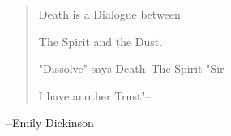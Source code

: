 \documentclass[letterpaper]{article}
\begin{document}
\begin{description}
\begin{enumerate}
\begin{quote}
Death is a Dialogue between

The Spirit and the Dust.

"Dissolve" says Death--The Spirit "Sir

I have another Trust"--
\end{quote}--Emily Dickinson
\end{enumerate}
\end{description}


\newpage


\end{document}
